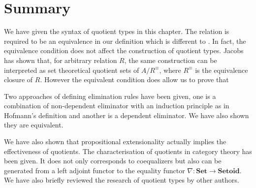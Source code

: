 \section{Summary}

We have given the syntax of quotient types in this chapter. The relation is required to be an equivalence in our definition which is different to \cite{hof:95:sm}. In fact, the equivalence condition does not affect the construction of quotient types. Jacobs  \cite{Jacobs94quotientsin}  has shown that, for arbitrary relation $R$, the same construction can be interpreted as set theoretical quotient sets of $A/R^{\equiv}$, where $R^{\equiv}$ is the equivalence closure of $R$. However the equivalent condition does allow us to prove that 

 Two approaches of defining elimination rules have been given, one is a combination of non-dependent eliminator with an induction principle as in Hofmann's definition and another is a dependent eliminator. We have also shown they are equivalent. 

We have also shown that propositional extensionality actually implies the effectiveness of quotients. The characterisation of quotients in category theory has been given. It does not only corresponds to coequalizers but also can be generated from a left adjoint functor to the equality functor $\nabla : \textbf{Set} \to \textbf{Setoid}$. We have also briefly reviewed the research of quotient types by other authors.






